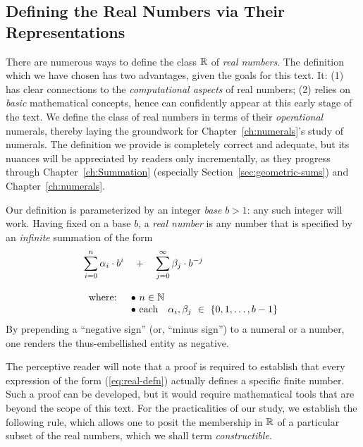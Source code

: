 \subsection{Defining the Real Numbers via Their Representations}
\label{sec:define-Reals}
   

There are numerous ways to define the class $\mathbb{R}$ of {\it real numbers}.  The definition which we have chosen has two advantages, given the goals for this text.  It: (1) has clear connections to the {\em computational aspects} of real numbers; (2) relies on {\em basic} mathematical concepts, hence can confidently appear at this early stage of the text.  We define the class of real numbers in terms of their {\em operational} numerals, thereby laying the groundwork for Chapter~\ref{ch:numerals}'s study of numerals.  The definition we provide is completely correct and adequate, but its nuances will be appreciated by readers only incrementally, as they progress through Chapter~\ref{ch:Summation} (especially Section~\ref{sec:geometric-sums}) and Chapter~\ref{ch:numerals}.

 
Our definition is parameterized by an integer {\it base} $b > 1$: any such integer will work.  Having fixed on a base $b$, a {\it real number} is any number that is specified by an {\em infinite} summation of the form
\begin{equation}
\label{eq:real-defn}
\begin{array}{l}
{\displaystyle
\sum_{i=0}^n \alpha_i \cdot b^i \ \ \ + \ \ \ \sum_{j=0}^\infty \beta_j \cdot b^{-j} }  \\
  \\
\begin{array}{ll}
\mbox{where: } & \bullet \ n \in \mathbb{N} \\
               & \bullet  \ \mbox{each } \ \ \alpha_i, \beta_j \ \in \ \{0, 1, \ldots, b-1\}
\end{array}
\end{array}
\end{equation}
By prepending a ``negative sign'' (or, ``minus sign'') to a numeral or a number, one renders the thus-embellished entity as negative.

\smallskip

The perceptive reader will note that a proof is required to establish that every expression of the form (\ref{eq:real-defn}) actually defines a specific finite number.  Such a proof can be developed, but it would require mathematical tools that are beyond the scope of this text.  For the practicalities of our study, we establish the following rule, which allows one to posit the membership in $\mathbb{R}$ of a particular subset of the real numbers, which we shall term {\it constructible}.
 

